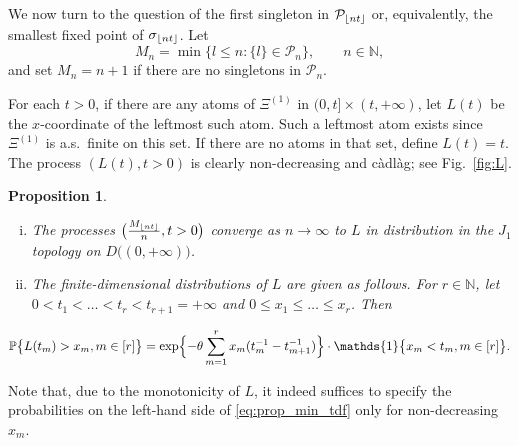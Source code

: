 \documentclass[11pt]{article}
\newcommand{\N}{\mathbb{N}}
\newcommand{\1}[1][]{
	\ifx&#1&\mathds{1}
	\else\mathds{1}\left\{#1\right\}\fi}
\newcommand{\Pc}{\mathcal{P}}
\DeclarePairedDelimiter\floor{\lfloor}{\rfloor}
\newtheorem{proposition}{Proposition}[section]
\theoremstyle{definition}
\theoremstyle{remark}
\numberwithin{equation}{section}
\begin{document}
	We now turn to the question of the first singleton in
	$\Pc_{\floor{nt}}$ or, equivalently, the smallest fixed point of $\sigma_{\floor{nt}}$. Let
	\begin{equation*}
		M_n = \min\{l\le n: \{l\} \in \Pc_n\}, \qquad n\in\N,
	\end{equation*}
	and set $M_n=n+1$ if there are no singletons in $\Pc_n$.
	
	For each $t>0$, if there are any atoms of $\Xi^{(1)}$ in $(0,t]\times(t,+\infty)$, let $L(t)$ be
	the $x$-coordinate of the leftmost such atom. Such a leftmost atom exists since $\Xi^{(1)}$ is a.s.~finite on this set. If there are no atoms in that set, define $L(t)=t$. The process $(L(t),t>0)$ is clearly
	non-decreasing and c\`adl\`ag; see Fig.~\ref{fig:L}.
	
	\begin{proposition}~
		\label{prop:ML}
		\begin{enumerate}[(i)]
			\item The processes $\bigl(\frac{M_{\floor{nt}}}{n},t>0\bigr)$ converge as
			$n\to\infty$ to $L$ in distribution in the $J_1$ topology on $D\bigl((0, +\infty)\bigr)$.
			\item The finite-dimensional distributions of $L$ are given as follows. For $r\in\N$,
			let $0<t_1<\ldots<t_r<t_{r+1}=+\infty$ and $0\le x_1\le\dots\le x_r$. Then
		\end{enumerate}
		\begin{equation}
			\label{eq:prop_min_tdf}
			\mathbb{P} \bigl\{L(t_m)>x_m, m\in[r]\bigr\} = 
			\exp\Bigl\{-\theta\sum_{m=1}^r x_m (t_m^{-1}-t_{m+1}^{-1})\Bigr\} \cdot \1\bigl\{x_m<t_m,m\in[r]\bigr\}.
		\end{equation}
	\end{proposition}
	
	Note that, due to the monotonicity of $L$, it indeed suffices to specify the probabilities
	on the left-hand side of \eqref{eq:prop_min_tdf} only for non-decreasing $x_m$.
	
\end{document}
